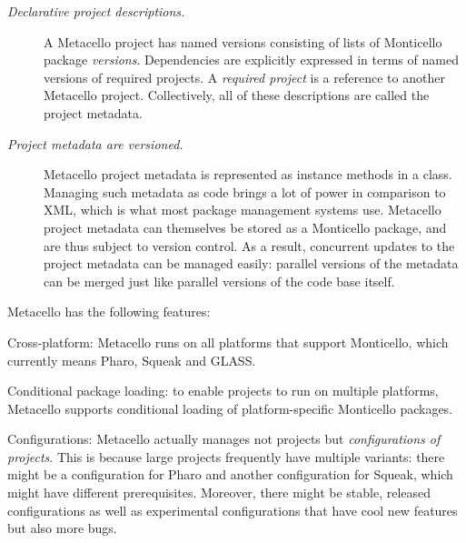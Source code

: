 \documentclass[a4paper,10pt,twoside]{book}
\begin{document}
\begin{description}
\item[\textit{Declarative project descriptions.}] A Metacello project has named versions consisting of lists of Monticello package \emph{versions}. Dependencies are explicitly expressed in terms of named versions of required projects. A \emph{required project} is a reference to another Metacello project.  Collectively, all of these descriptions are called the project metadata.

\item[\textit{Project metadata are versioned.}] Metacello project metadata is represented as instance methods in a class. Managing such metadata as code brings a lot of power in comparison to XML, which is what most package management systems use. Metacello project metadata can themselves be stored as a Monticello package, and are thus subject to version control. 
As a result,
concurrent updates to the project metadata can be managed easily: parallel versions of the metadata can be merged just like parallel versions of the code base itself. 



\end{description}

Metacello has the following features:

\begin{description}
\item Cross-platform: Metacello  runs on all platforms that support Monticello, which currently means Pharo, Squeak and GLASS.

\item Conditional package loading: to enable projects to run on multiple platforms, Metacello supports conditional loading of platform-specific Monticello packages. 

\item Configurations: Metacello actually manages not projects but \emph{configurations of projects}.  This is because large projects frequently have multiple variants: there might be a configuration for Pharo and another configuration for Squeak, which might have different prerequisites.  Moreover, there might be stable, released configurations as well as experimental configurations that have cool new features but also more bugs.

\end{description}
\end{document}
